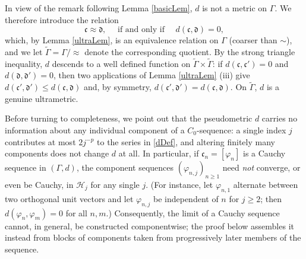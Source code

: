 \documentclass[twoside,11pt,letter]{article}
\def\cH{{\mathcal{H}}}
\def\fc{{\mathfrak{c}}}
\def\fd{{\mathfrak{d}}}
\theoremstyle{definition}
\theoremstyle{definition}
\theoremstyle{plain}
\newenvironment{remark}[1][Remark.]{\begin{trivlist}
\item[\hskip \labelsep {\bfseries #1}]}{\end{trivlist}}
\begin{document}
\begin{remark}
In view of the remark following Lemma \ref{basicLem}, $d$ is not a metric on $\Gamma$. We therefore introduce the relation
\begin{equation*}
\fc\approx\fd,\quad\text{ if and only if }\quad d(\fc,\fd)=0,
\end{equation*}
which, by Lemma \ref{ultraLem}, is an equivalence relation on $\Gamma$ (coarser than $\sim$), and we let $\widetilde\Gamma=\Gamma/\!\approx$ denote the corresponding quotient. By the strong triangle inequality, $d$ descends to a well defined function on $\widetilde\Gamma\times\widetilde\Gamma$: if $d(\fc,\fc')=0$ and $d(\fd,\fd')=0$, then two applications of Lemma \ref{ultraLem} (iii) give $d(\fc',\fd')\leq d(\fc,\fd)$ and, by symmetry, $d(\fc',\fd')=d(\fc,\fd)$. On $\widetilde\Gamma$, $d$ is a genuine ultrametric.
\end{remark}

\begin{remark}
Before turning to completeness, we point out that the pseudometric $d$ carries no information about any individual component of a $C_0$-sequence: a single index $j$ contributes at most $2 j^{-p}$ to the series in \eqref{dDef}, and altering finitely many components does not change $d$ at all. In particular, if $\fc_n=[\varphi_n]$ is a Cauchy sequence in $(\Gamma,d)$, the component sequences $(\varphi_{n,j})_{n\geq1}$ need \emph{not} converge, or even be Cauchy, in $\cH_j$ for any single $j$. (For instance, let $\varphi_{n,1}$ alternate between two orthogonal unit vectors and let $\varphi_{n,j}$ be independent of $n$ for $j\geq2$; then $d(\varphi_n,\varphi_m)=0$ for all $n,m$.) Consequently, the limit of a Cauchy sequence cannot, in general, be constructed componentwise; the proof below assembles it instead from blocks of components taken from progressively later members of the sequence.
\end{remark}
\end{document}
